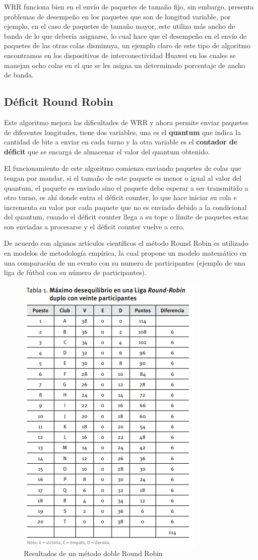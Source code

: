 \documentclass[conference,letterpaper]{IEEEtran}
\begin{document}
WRR funciona bien en el envío de paquetes de tamaño fijo, sin embargo, presenta problemas de desempeño en los paquetes que son de longitud variable, por ejemplo, en el caso de paquetes de tamaño mayor, este utiliza más ancho de banda de lo que debería asignarse, lo cual hace que el desempeño en el envío de paquetes de las otras colas disminuya, un ejemplo claro de este tipo de algoritmo encontramos en los dispositivos de interconectividad Huawei en los cuales se manejan ocho colas en el que se les asigna un determinado porcentaje de ancho de banda.

\subsection{D\'eficit Round Robin}
Este algoritmo mejora las dificultades de WRR y ahora permite enviar paquetes de diferentes longitudes, tiene dos variables, una es el \textbf{quantum} que indica la cantidad de bits a enviar en cada turno y la otra variable es el \textbf{contador de déficit} que se encarga de almacenar el valor del quantum obtenido.

El funcionamiento de este algoritmo comienza enviando paquetes de colas que tengan por mandar, si el tamaño de este paquete es menor o igual al valor del quantum, el paquete es enviado sino el paquete debe esperar a ser transmitido a otro turno, es ahí donde entra el déficit counter, lo que hace iniciar su cola e incrementa su valor por cada paquete que no es enviado debido a la condicional del quantum, cuando el déficit counter llega a su tope o límite de paquetes estas son enviadas a procesarse y el déficit counter vuelve a cero.

De acuerdo con algunos artículos científicos el método Round Robin es utilizado en modelos de metodología empírica, la cual propone un modelo matemático en una comparación de un evento con su numero de participantes (ejemplo de una liga de fútbol con su número de participantes).

\begin{figure}[thpb]
    \centering
    \includegraphics[width=0.55\linewidth]{tabla.png}
    \caption{Resultados de un método doble Round Robin}
    \label{fig:tabla}
\end{figure}
\end{document}
